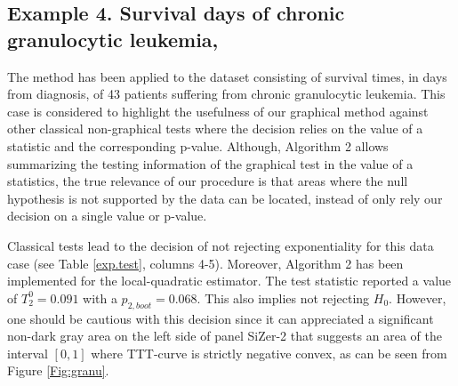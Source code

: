 \documentclass[preprint,12pt]{elsarticle}
\begin{document}
\subsection*{Example 4. Survival days of chronic granulocytic leukemia, \cite{BS69}}
The method has been applied to the dataset consisting of survival times, in days from diagnosis, of 43 patients suffering from chronic granulocytic leukemia. %
This case is considered to highlight the usefulness of our graphical method against other classical non-graphical tests where the decision relies on the value of a statistic and the corresponding p-value. Although, Algorithm 2 allows summarizing  the testing information of the graphical test in the value of a statistics, the true relevance of our procedure is that areas where the null hypothesis is not supported by the data can be located, instead of only rely our decision on a single value or p-value. 

Classical tests lead to the decision of not rejecting exponentiality for this data case (see Table \ref{exp.test}, columns 4-5). Moreover, Algorithm 2 has been implemented for the local-quadratic estimator. The test statistic reported a value of $T_2^0=0.091$ with a $p_{2,boot}=0.068$. This also implies not rejecting $H_0$. However, one should be cautious with this decision since  it can appreciated a significant non-dark gray area on the left side of panel SiZer-2 that suggests an area of the interval $[0,1]$ where TTT-curve is strictly negative convex, as can be seen from Figure \ref{Fig:granu}.
\end{document}
